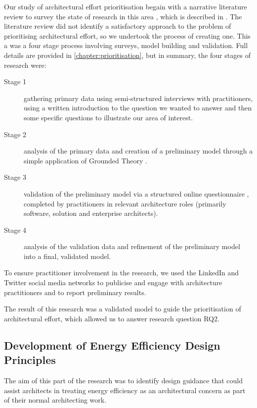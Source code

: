 Our study of architectural effort prioritisation begain with a narrative literature review to survey the state of research in this area \cite{baumeister1997-narrativereviews}, which is described in .  The literature review did not identify a satisfactory approach to the problem of prioritising architectural effort, so we undertook the process of creating one.  This a was a four stage process involving surveys, model building and validation.  Full details are provided in \cref{chapter:prioritisation}, but in summary, the four stages of research were:
\nopagebreak
\begin{description}
	\item [Stage 1] gathering primary data using semi-structured interviews with practitioners, using a written introduction to the question we wanted to answer and then some specific questions to illustrate our area of interest. 
	\item [Stage 2] analysis of the primary data and creation of a preliminary model through a simple application of Grounded Theory \cite{charmaz2006-groundedtheory}.
	\item [Stage 3] validation of the preliminary model via a structured online questionnaire \cite{gillham2000-questionnaire}, completed by practitioners in relevant architecture roles (primarily software, solution and enterprise architects).
	\item [Stage 4] analysis of the validation data and refinement of the preliminary model into a final, validated model.
\end{description}

To ensure practitioner involvement in the research, we used the LinkedIn and Twitter social media networks to publicise and engage with architecture practitioners and to report preliminary results.

The result of this research was a validated model to guide the prioritisation of architectural effort, which allowed us to answer research question RQ2.

\subsection{Development of Energy Efficiency Design Principles}

The aim of this part of the research was to identify design guidance that could assist architects in treating energy efficiency as an architectural concern as part of their normal architecting work.


